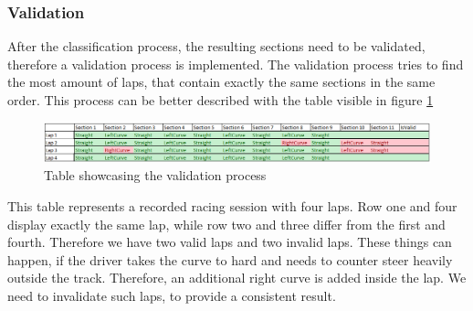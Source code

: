 \subsubsection{Validation}
After the classification process, the resulting sections need to be validated, therefore a validation process is implemented. The validation process tries to find the most amount of laps, that contain exactly the same sections in the same order. This process can be better described with the table visible in figure \ref{validation}
\begin{figure}[H]
	\centering
	\includegraphics[scale= 0.5]{Pictures/validation.png}
	\caption{Table showcasing the validation process}
	\label{validation}
\end{figure}
This table represents a recorded racing session with four laps. Row one and four display exactly the same lap, while row two and three differ from the first and fourth. Therefore we have two valid laps and two invalid laps. These things can happen, if the driver takes the curve to hard and needs to counter steer heavily outside the track. Therefore, an additional right curve is added inside the lap. We need to invalidate such laps, to provide a consistent result.
\newpage
